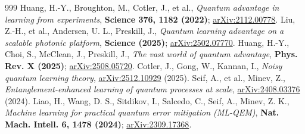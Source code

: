 \documentclass[11pt]{article}
\begin{document}
\begin{thebibliography}{999}
 Huang, H.-Y., Broughton, M., Cotler, J., et al., \emph{Quantum advantage in learning from experiments}, \textbf{Science 376, 1182 (2022)}; \href{https://arxiv.org/abs/2112.00778}{arXiv:2112.00778}.
 Liu, Z.-H., et al., Andersen, U. L., Preskill, J., \emph{Quantum learning advantage on a scalable photonic platform}, \textbf{Science (2025)}; \href{https://arxiv.org/abs/2502.07770}{arXiv:2502.07770}.
 Huang, H.-Y., Choi, S., McClean, J., Preskill, J., \emph{The vast world of quantum advantage}, \textbf{Phys. Rev. X (2025)}; \href{https://arxiv.org/abs/2508.05720}{arXiv:2508.05720}.
 Cotler, J., Gong, W., Kannan, I., \emph{Noisy quantum learning theory}, \href{https://arxiv.org/abs/2512.10929}{arXiv:2512.10929} (2025).
 Seif, A., et al., Minev, Z., \emph{Entanglement-enhanced learning of quantum processes at scale}, \href{https://arxiv.org/abs/2408.03376}{arXiv:2408.03376} (2024).
 Liao, H., Wang, D. S., Sitdikov, I., Salcedo, C., Seif, A., Minev, Z. K., \emph{Machine learning for practical quantum error mitigation (ML-QEM)}, \textbf{Nat. Mach. Intell. 6, 1478 (2024)}; \href{https://arxiv.org/abs/2309.17368}{arXiv:2309.17368}.
\end{thebibliography}
\endgroup
\end{document}

